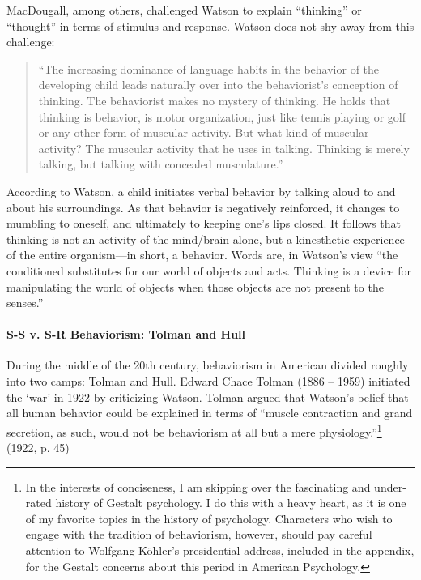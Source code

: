 MacDougall, among others, challenged Watson to explain ``thinking'' or ``thought'' in terms of stimulus and response. Watson does not shy away from this challenge:

\begin{quote}

``The increasing dominance of language habits in the behavior of the developing child leads naturally over into the behaviorist's conception of thinking. The behaviorist makes no mystery of thinking. He holds that thinking is behavior, is motor organization, just like tennis playing or golf or any other form of muscular activity. But what kind of muscular activity? The muscular activity that he uses in talking. Thinking is merely talking, but talking with concealed musculature.''
\end{quote}

According to Watson, a child initiates verbal behavior by talking aloud to and about his surroundings. As that behavior is negatively reinforced, it changes to mumbling to oneself, and ultimately to keeping one's lips closed. It follows that thinking is not an activity of the mind\slash brain alone, but a kinesthetic experience of the entire organism---in short, a behavior. Words are, in Watson's view ``the conditioned substitutes for our world of objects and acts. Thinking is a device for manipulating the world of objects when those objects are not present to the senses.''

\paragraph{S-S v. S-R Behaviorism: Tolman and Hull}
\label{s-sv.s-rbehaviorism:tolmanandhull}

During the middle of the 20th century, behaviorism in American divided roughly into two camps: Tolman and Hull. Edward Chace Tolman (1886 – 1959) initiated the `war' in 1922 by criticizing Watson. Tolman argued that Watson's belief that all human behavior could be explained in terms of ``muscle contraction and grand secretion, as such, would not be behaviorism at all but a mere physiology.''\footnote{In the interests of conciseness, I am skipping over the fascinating and under-rated history of Gestalt psychology. I do this with a heavy heart, as it is one of my favorite topics in the history of psychology. Characters who wish to engage with the tradition of behaviorism, however, should pay careful attention to Wolfgang Köhler's presidential address, included in the appendix, for the Gestalt concerns about this period in American Psychology.} (1922, p. 45)

